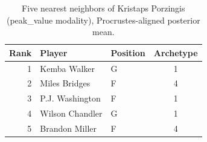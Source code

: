 \begin{table}[htbp]
  \centering\small
  \begin{tabular}{rllc}
    \toprule
    Rank & Player & Position & Archetype \\
    \midrule
    1 & Kemba Walker & G & 1 \\
    2 & Miles Bridges & F & 4 \\
    3 & P.J. Washington & F & 1 \\
    4 & Wilson Chandler & G & 1 \\
    5 & Brandon Miller & F & 4 \\
    \bottomrule
  \end{tabular}
  \caption{Five nearest neighbors of Kristaps Porzingis (peak_value modality), Procrustes-aligned posterior mean.}
  \label{tab:Kristaps_Porzingis_neighbors_peak_value}
\end{table}

